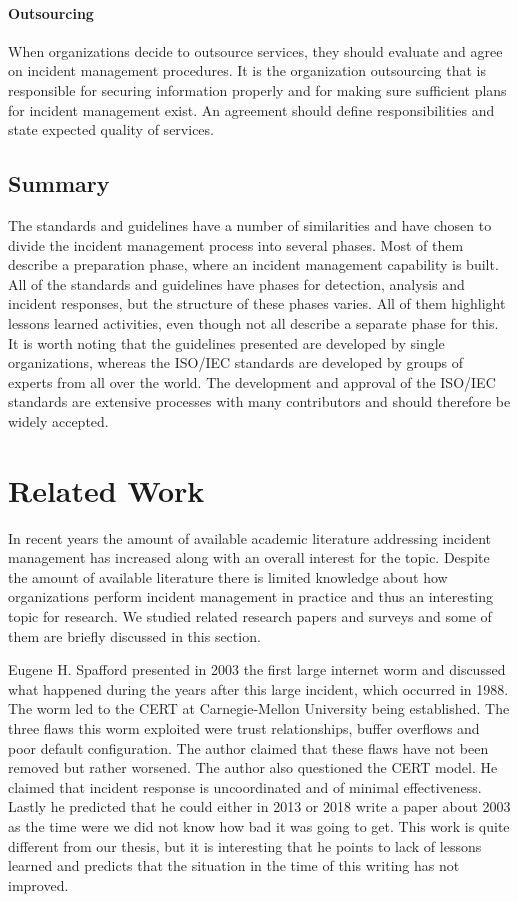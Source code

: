 \paragraph{Outsourcing}
When organizations decide to outsource services, they should evaluate and agree on incident management procedures. It is the organization outsourcing that is responsible for securing information properly and for making sure sufficient plans for incident management exist. An agreement should define responsibilities and state expected quality of services. 



\subsection{Summary}
The standards and guidelines have a number of similarities and have chosen to divide the incident management process into several phases. Most of them describe a preparation phase, where an incident management capability is built. All of the standards and guidelines have phases for detection, analysis and incident responses, but the structure of these phases varies. All of them highlight lessons learned activities, even though not all describe a separate phase for this. It is worth noting that the guidelines presented are developed by single organizations, whereas the ISO/IEC standards are developed by groups of experts from all over the world. The development and approval of the ISO/IEC standards are extensive processes with many contributors and should therefore be widely accepted.

\section{Related Work}
\label{relatedwork}
In recent years the amount of available academic literature addressing incident management has increased along with an overall interest for the topic. Despite the amount of available literature there is limited knowledge about how organizations perform incident management in practice and thus an interesting topic for research. We studied related research papers and surveys and some of them are briefly discussed in this section.

Eugene H. Spafford presented in 2003\cite{spafford2003failure} the first large internet worm and discussed what happened during the years after this large incident, which occurred in 1988. The worm led to the CERT at Carnegie-Mellon University being established. The three flaws this worm exploited were trust relationships, buffer overflows and poor default configuration. The author claimed that these flaws have not been removed but rather worsened. The author also questioned the CERT model. He claimed that incident response is uncoordinated and of minimal effectiveness. Lastly he predicted that he could either in 2013 or 2018 write a paper about 2003 as the time were we did not know how bad it was going to get. This work is quite different from our thesis, but it is interesting that he points to lack of lessons learned and predicts that the situation in the time of this writing has not improved.

